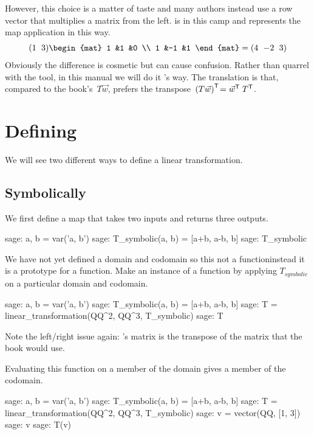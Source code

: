 However, this choice is a matter of taste and many authors instead
use a row vector that multiplies a matrix from the left.
\Sage{} is in this camp and
represents the map application in this way.
\begin{equation*}
  \rowvec{1 &3}
  \begin{mat}
    1 &1  &0 \\
    1 &-1 &1
  \end{mat}
  =
  \rowvec{4 &-2 &3}
\end{equation*}
Obviously the difference is cosmetic but can cause confusion.
Rather than quarrel with the tool, in this manual we will do it
\Sage's way.
The translation is that, compared to the book's~$T\vec{w}$,
\Sage{} prefers the 
transpose~${{(T\vec{w})}^{\mathsf{T}}}\!={{\vec{w}}^{\mathsf{T}}}\;{{T}^{\mathsf{T}}}$.



  

\section{Defining}
We will see two different ways to define a linear transformation.

\subsection{Symbolically}
We first define a map that takes two inputs and returns three outputs.
\begin{sagecommandline}
sage: a, b = var('a, b')   
sage: T_symbolic(a, b) = [a+b, a-b, b]         
sage: T_symbolic       
\end{sagecommandline}
We have not yet defined a domain and codomain 
so this not a function\Dash instead it is a prototype for a function.
Make an instance of a function by applying $T_{\textit{symbolic}}$ on a 
particular domain and codomain.  %
\begin{sagecommandline} 
sage: a, b = var('a, b')   
sage: T_symbolic(a, b) = [a+b, a-b, b]         
sage: T = linear_transformation(QQ^2, QQ^3, T_symbolic)
sage: T                                              
\end{sagecommandline}
\noindent Note the left/right issue again: \Sage's matrix is the transpose of
the matrix that the book would use.

Evaluating this function on a member of the domain gives a member
of the codomain. 
\begin{sagecommandline}
sage: a, b = var('a, b')   
sage: T_symbolic(a, b) = [a+b, a-b, b]         
sage: T = linear_transformation(QQ^2, QQ^3, T_symbolic)
sage: v = vector(QQ, [1, 3])  
sage: v
sage: T(v)
\end{sagecommandline}

